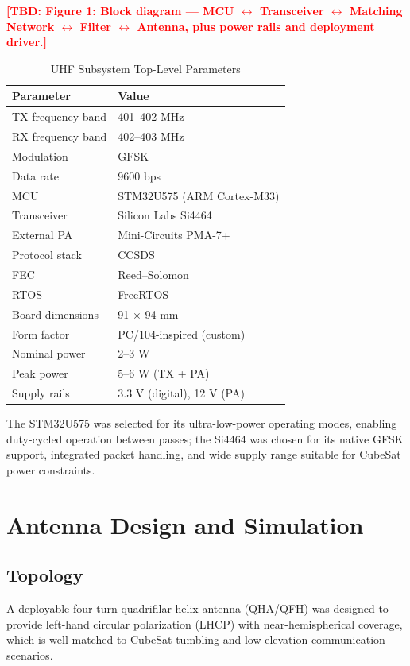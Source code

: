 \documentclass[conference]{IEEEtran}
\newcommand{\tbd}[1]{\textcolor{red}{\textbf{[TBD: #1]}}}
\begin{document}
\tbd{Figure 1: Block diagram --- MCU $\leftrightarrow$ Transceiver $\leftrightarrow$ Matching Network $\leftrightarrow$ Filter $\leftrightarrow$ Antenna, plus power rails and deployment driver.}

\begin{table}[!t]
\caption{UHF Subsystem Top-Level Parameters}
\label{tab:sys}
\centering
\begin{tabular}{ll}
\toprule
\textbf{Parameter} & \textbf{Value} \\
\midrule
TX frequency band & 401--402 MHz \\
RX frequency band & 402--403 MHz \\
Modulation & GFSK \\
Data rate & 9600 bps \\
MCU & STM32U575 (ARM Cortex-M33) \\
Transceiver & Silicon Labs Si4464 \\
External PA & Mini-Circuits PMA-7+ \\
Protocol stack & CCSDS \\
FEC & Reed--Solomon \\
RTOS & FreeRTOS \\
Board dimensions & 91 $\times$ 94 mm \\
Form factor & PC/104-inspired (custom) \\
Nominal power & 2--3 W \\
Peak power & 5--6 W (TX + PA) \\
Supply rails & 3.3 V (digital), 12 V (PA) \\
\bottomrule
\end{tabular}
\end{table}

The STM32U575 was selected for its ultra-low-power operating modes, enabling duty-cycled operation between passes; the Si4464 was chosen for its native GFSK support, integrated packet handling, and wide supply range suitable for CubeSat power constraints.

\section{Antenna Design and Simulation}

\subsection{Topology}
A deployable four-turn quadrifilar helix antenna (QHA/QFH) was designed to provide left-hand circular polarization (LHCP) with near-hemispherical coverage, which is well-matched to CubeSat tumbling and low-elevation communication scenarios.
\end{document}
